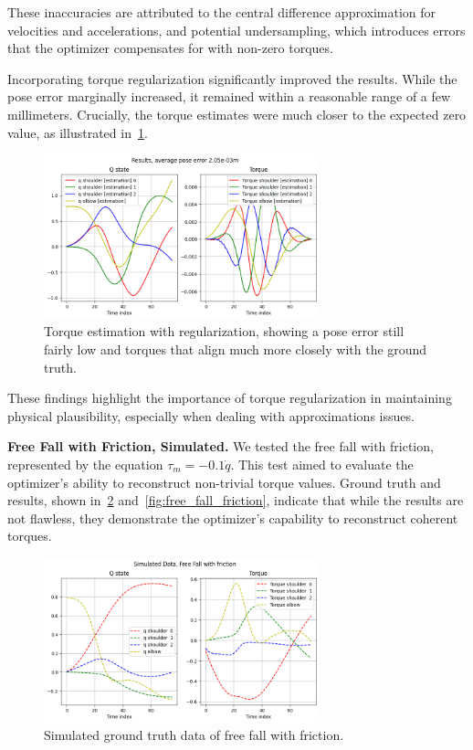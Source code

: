 These inaccuracies are attributed to the central difference approximation for velocities and accelerations, and potential undersampling, which 
introduces errors that the optimizer compensates for with non-zero torques.

Incorporating torque regularization significantly improved the results. While the pose error marginally increased, it remained within a 
reasonable range of a few millimeters. Crucially, the torque estimates were much closer to the expected zero value, as illustrated 
in~\cref{fig:free_fall_torque}.

\begin{figure}
    \centering
    \includegraphics[width=8cm]{figures/free_fall_torque.png}
    \caption{Torque estimation with regularization, showing a pose error still fairly low and torques that align much more closely with the ground truth.}
    \label{fig:free_fall_torque}
\end{figure}

These findings highlight the importance of torque regularization in maintaining physical plausibility, especially when dealing with 
approximations issues.

\noindent\textbf{Free Fall with Friction, Simulated.} We tested the free fall with friction, represented by the equation 
\(\tau_m = -0.1\dot{q}\). This test aimed to evaluate the optimizer's ability to reconstruct non-trivial torque values. Ground truth and results, 
shown in~\cref{fig:free_fall_friction_gt} and~\cref{fig:free_fall_friction}, indicate that while the results are not flawless, 
they demonstrate the optimizer's capability to reconstruct coherent torques.

\begin{figure}
    \centering
    \includegraphics[width=8cm]{figures/free_fall_friction_gt.png}
    \caption{Simulated ground truth data of free fall with friction.}
    \label{fig:free_fall_friction_gt}
\end{figure}

